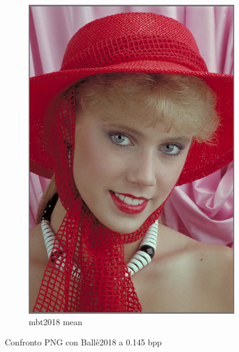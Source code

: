 \begin{figure}[!h]
\begin{subfigure}[]{0.25\textwidth}
        \includegraphics[width=\textwidth]{Immagini/IMAGES/mbt2018_mean_3_IMG0004.pdf}
        \caption{mbt2018 mean}
        \label{fig:CompressedMbt2018Mean}
    \end{subfigure}
    \caption{Confronto PNG con Ballè2018 a 0.145 bpp}
    \label{fig:CompressionMbt2018}
\end{figure}

